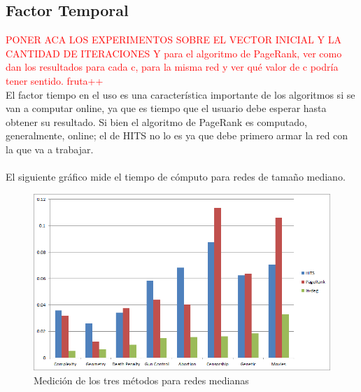 \documentclass[a4paper]{article}
\begin{document}
\subsection{Factor Temporal}
\textcolor{red}{PONER ACA LOS EXPERIMENTOS SOBRE EL VECTOR INICIAL Y LA CANTIDAD DE ITERACIONES
Y para el algoritmo de PageRank, ver como dan los resultados para cada c, para la misma red y ver qué valor de c podría tener sentido. fruta++ }
\\
\indent El factor tiempo en el uso es una caracter\'istica importante de los algoritmos si se van a computar online, ya que es tiempo que el usuario debe esperar hasta obtener su resultado. Si bien el algoritmo de PageRank es computado, generalmente, online; el de HITS no lo es ya que debe primero armar la red con la que va a trabajar.\\
\\
El siguiente gr\'afico mide el tiempo de c\'omputo para redes de tama\~no mediano.

\begin{figure}[h!]
  \begin{center}
	\includegraphics[scale=0.50]{imagenes/expTiempo/tiemposMedianos.png}
	\caption{Medici\'on de los tres m\'etodos para redes medianas}
	\label{nombreparareferenciar}
  \end{center}
\end{figure}
\end{document}

